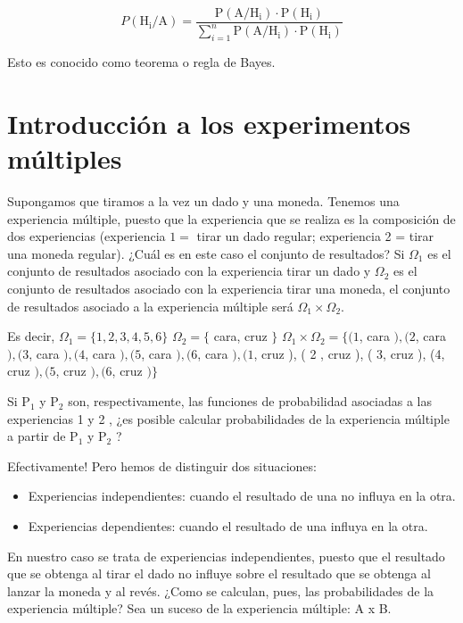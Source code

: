 \documentclass[
  a4paper,
  DIV=11,
  numbers=noendperiod]{scrreprt}
\providecommand{\tightlist}{%
  \setlength{\itemsep}{0pt}\setlength{\parskip}{0pt}}\usepackage{longtable,booktabs,array}
\begin{document}
\[
P\left(\mathrm{H}_{\mathrm{i}} / \mathrm{A}\right)=\frac{\mathrm{P}\left(\mathrm{A} / \mathrm{H}_{\mathrm{i}}\right) \cdot \mathrm{P}\left(\mathrm{H}_{\mathrm{i}}\right)}{\sum_{i=1}^{n} \mathrm{P}\left(\mathrm{A} / \mathrm{H}_{\mathrm{i}}\right) \cdot \mathrm{P}\left(\mathrm{H}_{\mathrm{i}}\right)}
\]

Esto es conocido como teorema o regla de Bayes.

\section{Introducción a los experimentos
múltiples}\label{introducciuxf3n-a-los-experimentos-muxfaltiples}

Supongamos que tiramos a la vez un dado y una moneda. Tenemos una
experiencia múltiple, puesto que la experiencia que se realiza es la
composición de dos experiencias (experiencia \(1=\) tirar un dado
regular; experiencia 2 = tirar una moneda regular). ¿Cuál es en este
caso el conjunto de resultados? Si \(\Omega_{1}\) es el conjunto de
resultados asociado con la experiencia tirar un dado y \(\Omega_{2}\) es
el conjunto de resultados asociado con la experiencia tirar una moneda,
el conjunto de resultados asociado a la experiencia múltiple será
\(\Omega_{1} \times \Omega_{2}\).

Es decir, \(\Omega_{1}=\{1,2,3,4,5,6\}\) \(\Omega_{2}=\{\) cara, cruz
\(\}\) \(\Omega_{1} \times \Omega_{2}=\{(1\), cara \(),(2\), cara
\(),(3\), cara \(),(4\), cara \(),(5\), cara \(),(6\), cara \(),(1\),
cruz ), ( 2 , cruz ), ( 3, cruz ), (4, cruz \(),(5\), cruz \(),(6\),
cruz \()\}\)

Si \(\mathrm{P}_{1}\) y \(\mathrm{P}_{2}\) son, respectivamente, las
funciones de probabilidad asociadas a las experiencias 1 y 2 , ¿es
posible calcular probabilidades de la experiencia múltiple a partir de
\(\mathrm{P}_{1}\) y \(\mathrm{P}_{2}\) ?

Efectivamente! Pero hemos de distinguir dos situaciones:

\begin{itemize}
\tightlist
\item
  Experiencias independientes: cuando el resultado de una no influya en
  la otra.
\item
  Experiencias dependientes: cuando el resultado de una influya en la
  otra.
\end{itemize}

En nuestro caso se trata de experiencias independientes, puesto que el
resultado que se obtenga al tirar el dado no influye sobre el resultado
que se obtenga al lanzar la moneda y al revés. ¿Como se calculan, pues,
las probabilidades de la experiencia múltiple? Sea un suceso de la
experiencia múltiple: A x B.
\end{document}
